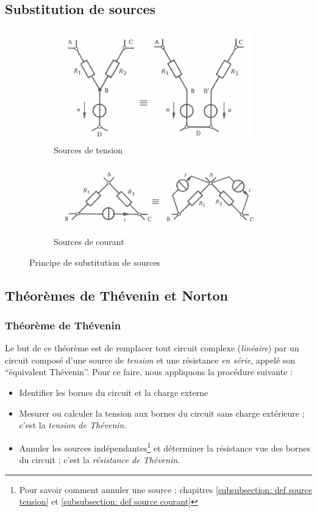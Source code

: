 \documentclass[12pt,a4paper]{article}
\begin{document}
\subsection{Substitution de sources}
\begin{figure}[!h]
	\centering
	\begin{subfigure}[b]{0.45\textwidth}
		\centering
		\includegraphics[scale=0.6]{images/substitution_tension}
		\caption{Sources de tension}
	\end{subfigure}
	\begin{subfigure}[b]{0.45\textwidth}
		\centering
		\includegraphics[scale=0.6]{images/substitution_courant}
		\caption{Sources de courant}
	\end{subfigure}
	\caption{Principe de substitution de sources}
\end{figure}

\subsection{Théorèmes de Thévenin et Norton}
\subsubsection{Théorème de Thévenin}
Le but de ce théorème est de remplacer tout circuit complexe (\textit{linéaire}) par un circuit composé d'une source de \textit{tension} et une résistance \textit{en série}, appelé son ``équivalent Thévenin''. Pour ce faire, nous appliquons la procédure suivante :
\begin{boite}
	\begin{itemize}
		\item 	Identifier les bornes du circuit et la charge externe
		\item 	Mesurer ou calculer la tension aux bornes du circuit sans charge extérieure ; c'est la \textit{tension de Thévenin}.
		\item 	Annuler les sources indépendantes\footnote{Pour savoir comment annuler une source : chapitres \ref{subsubsection: def source tension} et 	\ref{subsubsection: def source courant}} et déterminer la résistance vue des bornes du circuit ; c'est la \textit{résistance de Thévenin}.
	\end{itemize}
\end{boite}
\end{document}
